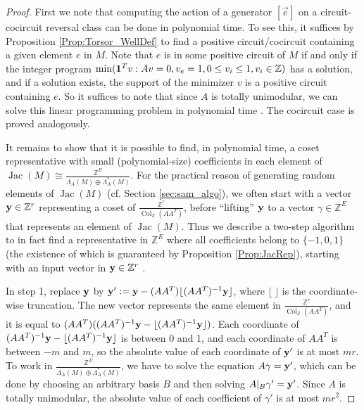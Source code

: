 \documentclass[12pt]{amsart}
\numberwithin{equation}{section}
\theoremstyle{definition}
\newcommand{\Col}{\operatorname{Col}}
\newcommand{\Jac}{\operatorname{Jac}}
\begin{document}
\begin{proof}
First we note that computing the action of a generator $[\overrightarrow{e}]$ on a circuit-cocircuit reversal class can be done in polynomial time. To see this, it suffices by Proposition \ref{Prop:Torsor_WellDef} to find a positive circuit/cocircuit containing a given element $e$ in $M$. Note that $e$ is in some positive circuit of $M$ if and only if the integer program $\min({\bf 1}^Tv:Av=0, v_e=1, 0\leq v_i\leq 1, v_i\in\mathbb{Z})$ has a solution, and if a solution exists, the support of the minimizer $v$ is a positive circuit containing $e$. So it suffices to note that since $A$ is totally unimodular, we can solve this linear programming problem in polynomial time \cite{schrijver1986LP}. 
The cocircuit case is proved analogously.


It remains to show that it is possible to find, in polynomial time, a coset representative with small (polynomial-size) coefficients in each element of $\Jac(M)\cong\frac{\mathbb{Z}^E}{\Lambda_A(M)\oplus \Lambda_A^*(M)}$.
For the practical reason of generating random elements of $\Jac(M)$ (cf. Section \ref{sec:sam_algo}), we often start with a vector ${\bf y}\in\mathbb{Z}^r$ representing a coset of $\frac{\mathbb{Z}^r}{\Col_{\mathbb{Z}}(AA^T)}$, before ``lifting'' ${\bf y}$ to a vector $\gamma\in\mathbb{Z}^E$ that represents an element of $\Jac(M)$.
Thus we describe a two-step algorithm to in fact find a representative in $\mathbb{Z}^E$ where all coefficients belong to $\{ -1,0,1 \}$ (the existence of which is guaranteed by Proposition \ref{Prop:JacRep}), starting with an input vector in ${\bf y}\in\mathbb{Z}^r$
.

In step 1, replace ${\bf y}$ by ${\bf y}':={\bf y}-(AA^T)\lfloor (AA^T)^{-1}{\bf y}\rfloor$, where $\lfloor\ \rfloor$ is the coordinate-wise truncation. The new vector represents the same element in $\frac{\mathbb{Z}^r}{\Col_{\mathbb{Z}}(AA^T)}$, and it is equal to $(AA^T)((AA^T)^{-1}{\bf y}-\lfloor (AA^T)^{-1}{\bf y}\rfloor)$. Each coordinate of $(AA^T)^{-1}{\bf y}-\lfloor (AA^T)^{-1}{\bf y}\rfloor$ is between 0 and 1, and each coordinate of $AA^T$ is between $-m$ and $m$, so the absolute value of each coordinate of ${\bf y}'$ is at most $mr$. To work in $\frac{\mathbb{Z}^E}{\Lambda_A(M)\oplus \Lambda_A^*(M)}$, we have to solve the equation $A\gamma={\bf y}'$, which can be done by choosing an arbitrary basis $B$ and then solving $A|_B\gamma'={\bf y}'$. Since $A$ is totally unimodular, the absolute value of each coefficient of $\gamma'$ is at most $mr^2$.


\end{proof}
\end{document}
